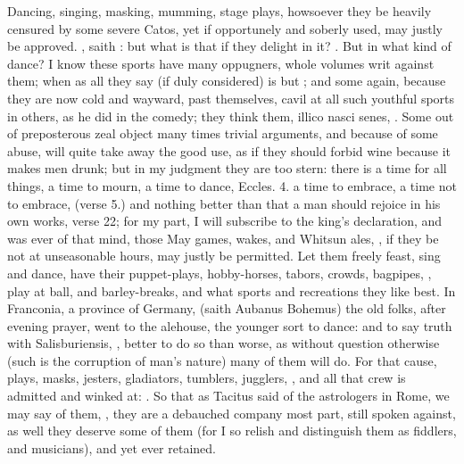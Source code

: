 {Dancing, singing, masking, mumming, stage plays, howsoever they be
heavily censured by some severe Catos, yet if opportunely and soberly
used, may justly be approved. ,
saith \Austin{}: but what is that if they delight in it? . But in
what kind of dance? I know these sports have
many oppugners, whole volumes writ against them; when as all they say
(if duly considered) is but ; and some again, because
they are now cold and wayward, past themselves, cavil at all such
youthful sports in others, as he did in the comedy; they think them,
illico nasci senes, \etc{}. Some out of preposterous zeal object many times
trivial arguments, and because of some abuse, will quite take away the
good use, as if they should forbid wine because it makes men drunk; but
in my judgment they are too stern: there is a time for all things, a
time to mourn, a time to dance, Eccles.  4. a time to embrace, a
time not to embrace, (verse 5.) and nothing better than that a man
should rejoice in his own works, verse 22; for my part, I will
subscribe to the king's declaration, and was ever of that mind, those
May games, wakes, and Whitsun ales, \etc{}, if they be not at unseasonable
hours, may justly be permitted. Let them freely feast, sing and dance,
have their puppet-plays, hobby-horses, tabors, crowds, bagpipes, \etc{},
play at ball, and barley-breaks, and what sports and recreations they
like best. In Franconia, a province of Germany, (saith Aubanus
Bohemus) the old folks, after evening prayer, went to the alehouse, the
younger sort to dance: and to say truth with Salisburiensis,
, better to do so than
worse, as without question otherwise (such is the corruption of man's
nature) many of them will do. For that cause, plays, masks, jesters,
gladiators, tumblers, jugglers, \etc{}, and all that crew is admitted and
winked at: . So that as Tacitus said of
the astrologers in Rome, we may say of them, , they are a debauched company most
part, still spoken against, as well they deserve some of them (for I so relish
and distinguish them as fiddlers, and musicians), and yet ever retained.

}
